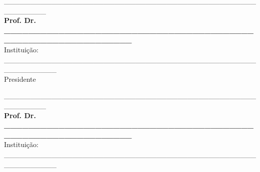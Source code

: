 \documentclass[
	12pt,				%
	oneside,			%
	a4paper,			%
	english,			%
	brazil				%
	]{abntex2ppgsi}
\begin{document}
\begin{folhadeaprovacao}
\begin{center}
%
% 
% 
% 
% 
% 
%
%
\_\_\_\_\_\_\_\_\_\_\_\_\_\_\_\_\_\_\_\_\_\_\_\_\_\_\_\_\_\_\_\_\_\_\_\_\_\_\_\_\_\_\_\_\_\_\_\_\_\_\_\_\_\_\_\_
\vspace*{0.2cm} 
\\ \textbf{Prof. Dr. \_\_\_\_\_\_\_\_\_\_\_\_\_\_\_\_\_\_\_\_\_\_\_\_\_\_\_\_\_\_\_\_\_\_\_\_\_\_\_\_\_\_\_\_\_\_\_\_\_\_\_\_\_\_\_\_\_\_\_\_\_\_} 
\\ \vspace*{0.2cm} 
Instituição: \_\_\_\_\_\_\_\_\_\_\_\_\_\_\_\_\_\_\_\_\_\_\_\_\_\_\_\_\_\_\_\_\_\_\_\_\_\_\_\_\_\_\_\_\_\_\_\_\_\_\_\_\_\_\_\_\_\_ 
\\ \vspace*{0.2cm}
Presidente 

\vspace*{2cm}

\_\_\_\_\_\_\_\_\_\_\_\_\_\_\_\_\_\_\_\_\_\_\_\_\_\_\_\_\_\_\_\_\_\_\_\_\_\_\_\_\_\_\_\_\_\_\_\_\_\_\_\_\_\_\_\_
\vspace*{0.2cm} 
\\ \textbf{Prof. Dr. \_\_\_\_\_\_\_\_\_\_\_\_\_\_\_\_\_\_\_\_\_\_\_\_\_\_\_\_\_\_\_\_\_\_\_\_\_\_\_\_\_\_\_\_\_\_\_\_\_\_\_\_\_\_\_\_\_\_\_\_\_\_} 
\\ \vspace*{0.2cm} 
Instituição: \_\_\_\_\_\_\_\_\_\_\_\_\_\_\_\_\_\_\_\_\_\_\_\_\_\_\_\_\_\_\_\_\_\_\_\_\_\_\_\_\_\_\_\_\_\_\_\_\_\_\_\_\_\_\_\_\_\_

\vspace*{2cm}


\end{center}
\end{folhadeaprovacao}
\end{document}
